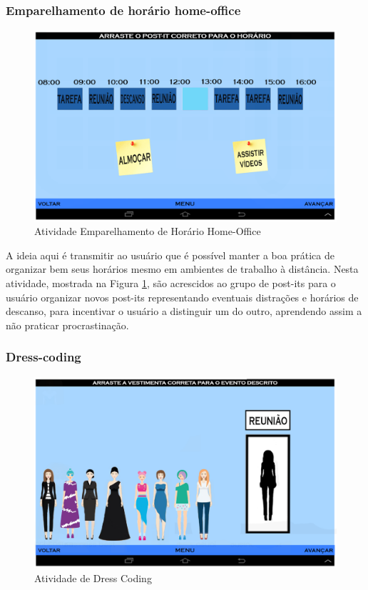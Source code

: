 \documentclass[12pt]{article}
\begin{document}
\subsubsection{Emparelhamento de horário home-office}

 \begin{figure}[h!]
    \centering
    \includegraphics[width=1.0\textwidth]{emparelhamento_home_office.png}
    \caption{ Atividade Emparelhamento de Horário Home-Office }
    \label{fig:emparelha_home_office}
\end{figure}

A ideia aqui é transmitir ao usuário que é possível manter a boa prática de organizar bem seus horários mesmo em ambientes de trabalho à distância. Nesta atividade, mostrada na Figura \ref{fig:emparelha_home_office}, são acrescidos ao grupo de post-its para o usuário organizar novos post-its representando eventuais distrações e horários de descanso, para incentivar o usuário a distinguir um do outro, aprendendo assim a não praticar procrastinação.

\subsubsection{Dress-coding}

 \begin{figure}[h!]
    \centering
    \includegraphics[width=1.0\textwidth]{dress_code.png}
    \caption{ Atividade de Dress Coding }
    \label{fig:dress_code}
\end{figure}
\end{document}
